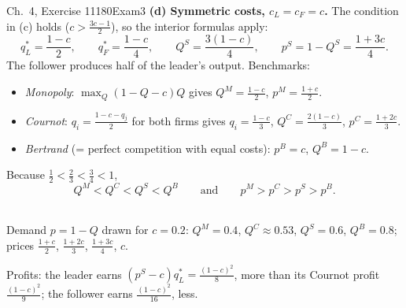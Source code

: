 \begin{exsol}{\MG{} Ch.~4, Exercise 11}{180}{Exam}{3}
\textbf{(d) Symmetric costs, $c_L = c_F = c$.} The condition in (c) holds ($c > \frac{3c-1}{2}$),
so the interior formulas apply:
\[
  q_L^* = \frac{1-c}{2},\qquad q_F^* = \frac{1-c}{4},\qquad
  Q^{S} = \frac{3(1-c)}{4},\qquad p^{S} = 1 - Q^S = \frac{1+3c}{4}.
\]
The follower produces half of the leader's output. Benchmarks:
\begin{itemize}
  \item \emph{Monopoly}: $\max_Q (1-Q-c)Q$ gives $Q^M = \frac{1-c}{2}$, $p^M = \frac{1+c}{2}$.
  \item \emph{Cournot}: $q_i = \frac{1-c-q_j}{2}$ for both firms gives $q_i = \frac{1-c}{3}$,
  $Q^C = \frac{2(1-c)}{3}$, $p^C = \frac{1+2c}{3}$.
  \item \emph{Bertrand} (= perfect competition with equal costs): $p^B = c$, $Q^B = 1-c$.
\end{itemize}
Because $\frac12 < \frac23 < \frac34 < 1$,
\[
  Q^M < Q^C < Q^S < Q^B \qquad\text{and}\qquad p^M > p^C > p^S > p^B .
\]
\begin{center}
\\[2pt]
{\footnotesize Demand $p = 1-Q$ drawn for $c = 0.2$: $Q^M = 0.4$, $Q^C \approx 0.53$, $Q^S = 0.6$,
$Q^B = 0.8$; prices $\frac{1+c}{2}$, $\frac{1+2c}{3}$, $\frac{1+3c}{4}$, $c$.}
\end{center}
Profits: the leader earns $(p^S - c)q_L^* = \frac{(1-c)^2}{8}$, more than its Cournot profit
$\frac{(1-c)^2}{9}$; the follower earns $\frac{(1-c)^2}{16}$, less.


\end{exsol}
